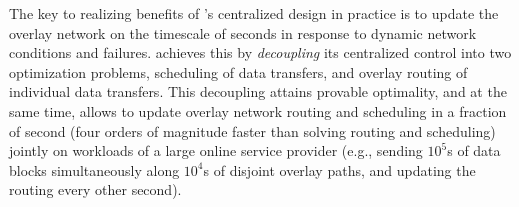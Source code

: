 

The key to realizing benefits of \name's centralized design in practice is to update
the overlay network on the timescale of seconds in response to dynamic network conditions
and failures. \name achieves this by {\em decoupling} its centralized control
into two optimization problems, scheduling of data transfers, and
overlay routing of individual data transfers.
This decoupling attains provable optimality, and at the same time,
allows \name to update overlay network routing and scheduling in
a fraction of second (four orders of magnitude faster than solving
routing and scheduling) jointly on workloads
of a large online service provider (e.g., sending $10^5$s of data blocks
simultaneously along $10^4$s of disjoint overlay paths, and updating
the routing every other second).


